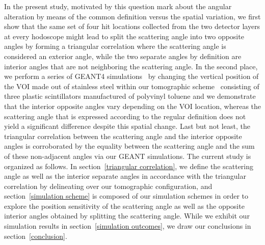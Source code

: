 \documentclass[10.75pt]{article}
\begin{document}
In the present study, motivated by this question mark about the angular alteration by means of the common definition versus the spatial variation, we first show that the same set of four hit locations collected from the two detector layers at every hodoscope might lead to split the scattering angle into two opposite angles by forming a triangular correlation where the scattering angle is considered an exterior angle, while the two separate angles by definition are interior angles that are not neighboring the scattering angle. In the second place, we perform a series of GEANT4 simulations~\cite{agostinelli2003geant4} by changing the vertical position of the VOI made out of stainless steel within our tomographic scheme~\cite{georgadze2021method} consisting of three plastic scintillators manufactured of polyvinyl toluene and we demonstrate that the interior opposite angles vary depending on the VOI location, whereas the scattering angle that is expressed according to the regular definition does not yield a significant difference despite this spatial change. Last but not least, the triangular correlation between the scattering angle and the interior opposite angles is corroborated by the equality between the scattering angle and the sum of these non-adjacent angles via our GEANT simulations. The current study is organized as follows. In section~\ref{triangular correlation}, we define the scattering angle as well as the interior separate angles in accordance with the triangular correlation by delineating over our tomographic configuration, and section~\ref{simulation scheme} is composed of our simulation schemes in order to explore the position sensitivity of the scattering angle as well as the opposite interior angles obtained by splitting the scattering angle. While we exhibit our simulation results in section~\ref{simulation outcomes}, we draw our conclusions in section~\ref{conclusion}.
\end{document}

